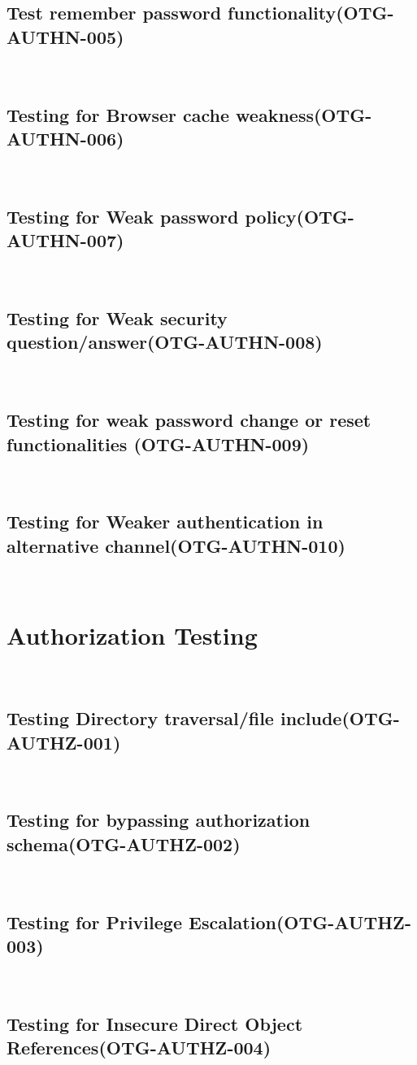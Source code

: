 \documentclass[headsepline,footsepline,footinclude=false,oneside,fontsize=11pt,paper=a4,listof=totoc,bibliography=totoc]{scrbook} %
\begin{document}
\subsection{Test remember password functionality(OTG-AUTHN-005)}\
\pagebreak 
\subsection{Testing for Browser cache weakness(OTG-AUTHN-006)}\
\pagebreak 
\subsection{Testing for Weak password policy(OTG-AUTHN-007)}\
\pagebreak 
\subsection{Testing for Weak security question/answer(OTG-AUTHN-008)}\
\pagebreak 
\subsection{Testing for weak password change or reset functionalities (OTG-AUTHN-009)}\
\pagebreak 
\subsection{Testing for Weaker authentication in alternative channel(OTG-AUTHN-010)}\
 
\pagebreak 
\section{Authorization Testing}\
\subsection{Testing Directory traversal/file include(OTG-AUTHZ-001)}\
\pagebreak 
\subsection{Testing for bypassing authorization schema(OTG-AUTHZ-002)}\
\pagebreak 
\subsection{Testing for Privilege Escalation(OTG-AUTHZ-003)}\
\pagebreak 
\subsection{Testing for Insecure Direct Object References(OTG-AUTHZ-004)}\
 
\end{document}
